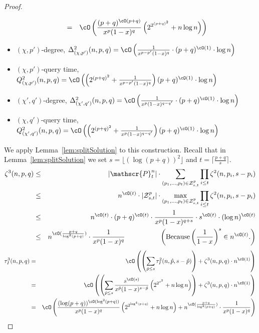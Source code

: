 \begin{proof}
\begin{itemize}
\begin{eqnarray*}
&=&\cO\left( \frac{(p+q)^{\cO(p+q)}}{x^{p}(1-x)^q}\left({2^{2^{(p+q)^2}}}+n \log n\right)\right)
\end{eqnarray*}
\item $(\chi,p')$-degree, $\Delta_{(\chi,p')}^2(n,p,q) =\cO\left( \frac{1}{x^{p-p'}{(1-x)^q}} \cdot  (p+q)^{\cO(1)} \cdot \log n\right)$
\item $(\chi,p')$-query time, $Q_{(\chi,p')}^2(n,p,q)=\cO\left(\left(2^{(p+q)^2} + \frac{1}{x^{p-p'}{(1-x)^q}}\right)   (p+q)^{\cO(1)} \cdot \log n\right)$
\item $(\chi',q')$-degree, $\Delta_{(\chi',q')}^2(n,p,q) =\cO\left( \frac{1}{x^{p}(1-x)^{q-q'}} \cdot  (p+q)^{\cO(1)} \cdot \log n\right)$
\item $(\chi,q')$-query time, $Q_{(\chi',q')}^2(n,p,q)=\cO\left(\left(2^{(p+q)^2} + \frac{1}{x^{p}(1-x)^{q-q'}}\right)   (p+q)^{\cO(1)} \cdot \log n\right)$
\end{itemize}
We apply Lemma~\ref{lem:splitSolution} to this construction. Recall that in Lemma~\ref{lem:splitSolution} 
we set $s=\lfloor(\log (p+q))^2 \rfloor$ and $t = \lceil \frac{p+q}{s} \rceil$.
\begin{eqnarray*}
 \zeta^3(n,p,q) &\leq& |\mathscr{P}_t^{n}| \cdot 
\sum_{(p_1,\ldots,p_t) \in {\cal Z}_{s,t}^{p}} \prod_{i \leq t} \zeta^2(n,p_i,s-p_i)\\
&\leq& n^{\cO(t)}\cdot |{\cal Z}_{s,t}^{p}| \cdot \max_{(p_1,\ldots,p_t) \in {\cal Z}_{s,t}^{p}} \prod_{i \leq t} \zeta^2(n,p_i,s-p_i)\\
&\leq& n^{\cO(t)}\cdot (p+q)^{\cO(t)}\cdot \frac{1}{x^{p}(1-x)^{q+s}}\cdot s^{\cO(t)}\cdot (\log n)^{\cO(t)}\\
&\leq& n^{\cO(\frac{p+q}{\log^2(p+q)})}\cdot \frac{1}{x^{p}(1-x)^{q}} \qquad\qquad\quad \left(\mbox{Because} \left(\frac{1}{1-x}\right)^s\in n^{\cO(t)}.\right)\\
\end{eqnarray*}
\begin{eqnarray*}
\tau_I^3(n,p,q) &=&\cO\left(\left(\sum_{\hat{p} \leq s} \tau_I^2(n,\hat{p},s-\hat{p})\right) + \zeta^3(n,p,q) \cdot n^{\cO(1)}\right)\\
&=&\cO\left(\left(\sum_{\hat{p} \leq s} \frac{s^{\cO(s)}}{x^{\hat{p}}(1-x)^{s-\hat{p}}}\left({2^{2^{s^2}}}+n \log n\right)\right) + \zeta^3(n,p,q) \cdot n^{\cO(1)}\right)\\
&=& \cO\left(\frac{(\log(p+q))^{\cO(\log^2(p+q))}}{x^{p}(1-x)^{q}}\left({2^{2^{\log^4(p+q)}}}+n \log n\right) + n^{\cO(\frac{p+q}{\log^2(p+q)})}\cdot \frac{1}{x^{p}(1-x)^{q}}\right)\\

\end{eqnarray*}
\end{proof}
